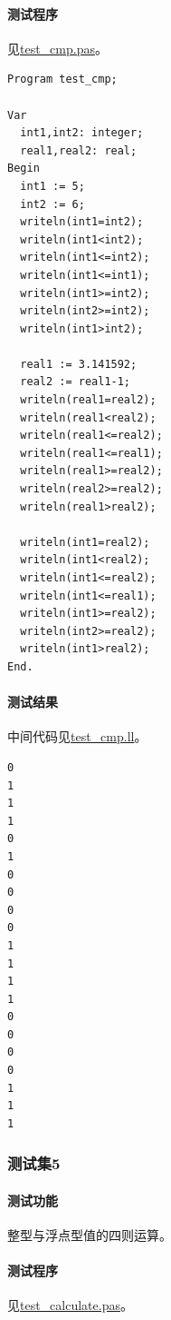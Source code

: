 \documentclass[lang=cn,11pt,a4paper,cite=authornum]{paper}
\begin{document}
\paragraph{测试程序} 见\href{run:../test/test_cmp.pas}{test\_cmp.pas}。

\begin{code}
\begin{verbatim}
Program test_cmp;

Var 
  int1,int2: integer;
  real1,real2: real;
Begin
  int1 := 5;
  int2 := 6;
  writeln(int1=int2);
  writeln(int1<int2);
  writeln(int1<=int2);
  writeln(int1<=int1);
  writeln(int1>=int2);
  writeln(int2>=int2);
  writeln(int1>int2);

  real1 := 3.141592;
  real2 := real1-1;
  writeln(real1=real2);
  writeln(real1<real2);
  writeln(real1<=real2);
  writeln(real1<=real1);
  writeln(real1>=real2);
  writeln(real2>=real2);
  writeln(real1>real2);

  writeln(int1=real2);
  writeln(int1<real2);
  writeln(int1<=real2);
  writeln(int1<=real1);
  writeln(int1>=real2);
  writeln(int2>=real2);
  writeln(int1>real2);
End.

\end{verbatim}
\end{code}

\paragraph{测试结果} 中间代码见\href{run:../test/test_cmp.ll}{test\_cmp.ll}。

\begin{code}
\begin{verbatim}
0
1
1
1
0
1
0
0
0
0
1
1
1
1
0
0
0
0
1
1
1
\end{verbatim}
\end{code}

\subsubsection{测试集5}

\paragraph{测试功能} 整型与浮点型值的四则运算。

\paragraph{测试程序} 见\href{run:../test/test_calculate.pas}{test\_calculate.pas}。
\end{document}
